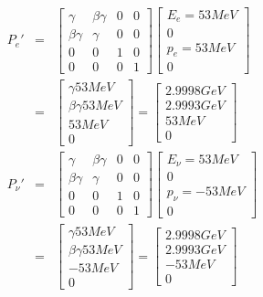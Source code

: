 \documentclass[11pt]{amsart}
\begin{document}
\begin{eqnarray*}
P_{e}' &=& \begin{bmatrix}
	\gamma & \beta\gamma & 0 & 0 \\
	\beta\gamma & \gamma & 0 & 0 \\
	0 & 0 & 1 & 0 \\
	0 & 0 & 0 & 1 
	\end{bmatrix}\begin{bmatrix}
	E_{e}=53MeV \\
	0 \\
	p_{e}=53MeV \\
	0 
	\end{bmatrix} \\
&=& \begin{bmatrix}
	\gamma{53MeV} \\
	\beta\gamma{53MeV} \\
	53MeV \\
	0 
	\end{bmatrix} = \begin{bmatrix}
	2.9998GeV \\
	2.9993GeV \\
	53MeV \\
	0 
	\end{bmatrix} \\
P_{\nu}' &=& \begin{bmatrix}
	\gamma & \beta\gamma & 0 & 0 \\
	\beta\gamma & \gamma & 0 & 0 \\
	0 & 0 & 1 & 0 \\
	0 & 0 & 0 & 1 
	\end{bmatrix}\begin{bmatrix}
	E_{\nu}=53MeV \\
	0 \\
	p_{\nu}=-53MeV \\
	0 
	\end{bmatrix} \\
&=& \begin{bmatrix}
	\gamma{53MeV} \\
	\beta\gamma{53MeV} \\
	-53MeV \\
	0 
	\end{bmatrix} = \begin{bmatrix}
	2.9998GeV \\
	2.9993GeV \\
	-53MeV \\
	0 
	\end{bmatrix} \\
	\end{eqnarray*} 
\end{document}
